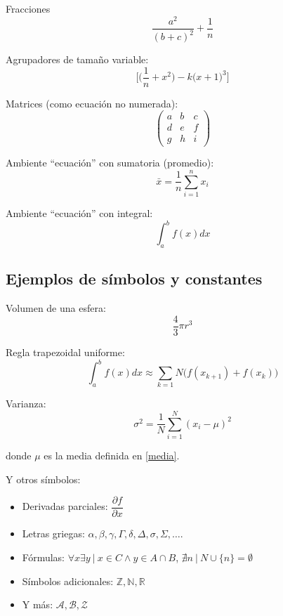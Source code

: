 Fracciones
\begin{equation}
\frac{a^2}{(b + c)^2} + \frac{1}{n}
\end{equation}

Agrupadores de tamaño variable:
\begin{equation}
\Big[ \Big( \frac{1}{n} + x^2 \Big) - k\big(x + 1\big)^3 \Big]
\end{equation}

Matrices (como ecuación no numerada):
\begin{equation*}
 \left(
    \begin{array}{ccc}
        a & b & c \\
        d & e & f \\
        g & h & i
    \end{array}
\right)
\end{equation*}

Ambiente ``ecuación'' con sumatoria (promedio):
\begin{equation}
\bar{x} = \frac{1}{n} \sum_{i=1}^{n} x_i
\label{media}
\end{equation}

Ambiente ``ecuación'' con integral:
\begin{equation}
\int _a ^b f(x) dx
\end{equation}

\subsection{Ejemplos de símbolos y constantes}

Volumen de una esfera:
\begin{equation}
\frac{4}{3} \pi r^3
\end{equation}

Regla trapezoidal uniforme:
\begin{equation}
\int_a ^b f(x)dx \approx \sum_{k=1}{N} \big( f(x_{k+1}) + f(x_k) \big)
\end{equation}

Varianza:
\begin{equation}
\sigma^2 = \frac{1}{N} \sum_{i=1}^{N} (x_i - \mu)^2
\end{equation}

donde $\mu$ es la media definida en \ref{media}.
\newline

Y otros símbolos:
\begin{itemize}
\item Derivadas parciales: $\dfrac{\partial f}{\partial x}$

\item Letras griegas: $\alpha, \beta, \gamma, \Gamma, \delta, \Delta, \sigma, \Sigma, \ldots$.

\item Fórmulas: $\forall x\exists y ~|~ x \in C \land y \in A \cap B$, $\nexists n ~|~ N \cup \{n\} = \emptyset$

\item Símbolos adicionales: $\mathbb{Z}, \mathbb{N}, \mathbb{R}$

\item Y más: $\mathscr{A}, \mathscr{B}, \mathscr{Z}$
\end{itemize}

